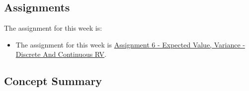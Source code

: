 \subsection{Assignments}

The assignment for this week is:

\begin{itemize}
    \item The assignment for this week is \href{https://github.com/QuantumCompiler/CU/tree/main/CSPB%203022%20-%20Introduction%20To%20Data%20Science%20With%20Probability%20And%20Statistics/CSPB%203022%20-%20Assignments/CSPB%203022%20-%20Assignment%206%20-%20Expected%20Value%2C%20Variance%20-%20Discrete%20And%20Continuous%20RV}{Assignment 6 - Expected Value, Variance - Discrete And Continuous RV}. 
\end{itemize}

\subsection{Concept Summary}

